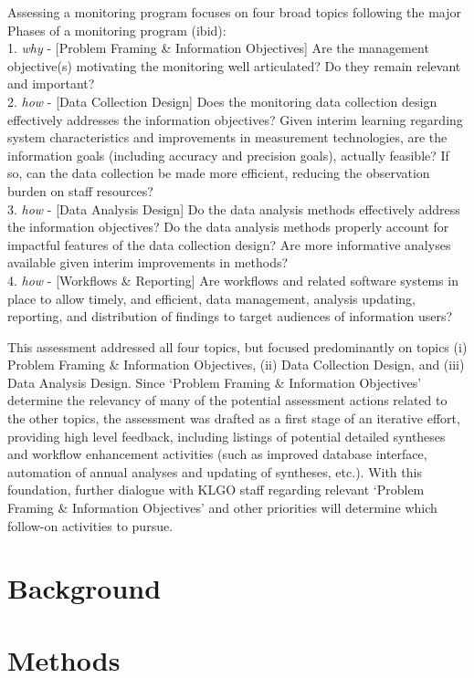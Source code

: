 \documentclass[]{article}
\begin{document}
Assessing a monitoring program focuses on four broad topics following
the major Phases of a monitoring program (ibid):\\
1. \emph{why} - {[}Problem Framing \& Information Objectives{]} Are the
management objective(s) motivating the monitoring well articulated? Do
they remain relevant and important?\\
2. \emph{how} - {[}Data Collection Design{]} Does the monitoring data
collection design effectively addresses the information objectives?
Given interim learning regarding system characteristics and improvements
in measurement technologies, are the information goals (including
accuracy and precision goals), actually feasible? If so, can the data
collection be made more efficient, reducing the observation burden on
staff resources?\\
3. \emph{how} - {[}Data Analysis Design{]} Do the data analysis methods
effectively address the information objectives? Do the data analysis
methods properly account for impactful features of the data collection
design? Are more informative analyses available given interim
improvements in methods?\\
4. \emph{how} - {[}Workflows \& Reporting{]} Are workflows and related
software systems in place to allow timely, and efficient, data
management, analysis updating, reporting, and distribution of findings
to target audiences of information users?

This assessment addressed all four topics, but focused predominantly on
topics (i) Problem Framing \& Information Objectives, (ii) Data
Collection Design, and (iii) Data Analysis Design. Since `Problem
Framing \& Information Objectives' determine the relevancy of many of
the potential assessment actions related to the other topics, the
assessment was drafted as a first stage of an iterative effort,
providing high level feedback, including listings of potential detailed
syntheses and workflow enhancement activities (such as improved database
interface, automation of annual analyses and updating of syntheses,
etc.). With this foundation, further dialogue with KLGO staff regarding
relevant `Problem Framing \& Information Objectives' and other
priorities will determine which follow-on activities to pursue.

\section{Background}\label{background}

\section{Methods}\label{methods}
\end{document}
